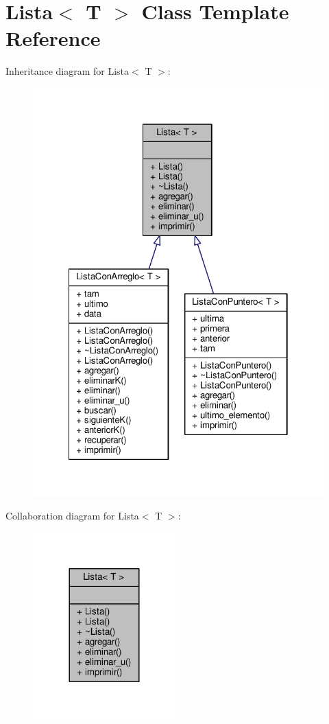 \hypertarget{class_lista}{\section{Lista$<$ T $>$ Class Template Reference}
\label{class_lista}
}


Inheritance diagram for Lista$<$ T $>$\+:
\nopagebreak
\begin{figure}[H]
\begin{center}
\leavevmode
\includegraphics[width=322pt]{class_lista__inherit__graph}
\end{center}
\end{figure}


Collaboration diagram for Lista$<$ T $>$\+:
\nopagebreak
\begin{figure}[H]
\begin{center}
\leavevmode
\includegraphics[width=156pt]{class_lista__coll__graph}
\end{center}
\end{figure}
